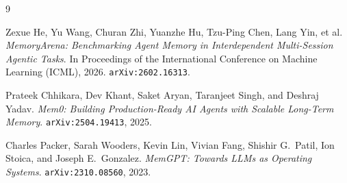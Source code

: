 \documentclass[11pt,a4paper]{article}
\begin{document}
\begin{thebibliography}{9}

Zexue He, Yu Wang, Churan Zhi, Yuanzhe Hu, Tzu-Ping Chen, Lang Yin, et al.
\newblock \emph{MemoryArena: Benchmarking Agent Memory in Interdependent Multi-Session Agentic Tasks}.
\newblock In Proceedings of the International Conference on Machine Learning (ICML), 2026. \texttt{arXiv:2602.16313}.

Prateek Chhikara, Dev Khant, Saket Aryan, Taranjeet Singh, and Deshraj Yadav.
\newblock \emph{Mem0: Building Production-Ready AI Agents with Scalable Long-Term Memory}.
\newblock \texttt{arXiv:2504.19413}, 2025.

Charles Packer, Sarah Wooders, Kevin Lin, Vivian Fang, Shishir G.\ Patil, Ion Stoica, and Joseph E.\ Gonzalez.
\newblock \emph{MemGPT: Towards LLMs as Operating Systems}.
\newblock \texttt{arXiv:2310.08560}, 2023.

\end{thebibliography}
\end{document}
